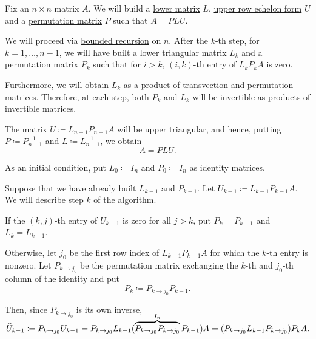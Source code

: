 \begin{algorithm}\label{alg:plu_decomposition}
  Fix an \( n \times n \) matrix \( A \). We will build a \hyperref[def:triangular_matrix]{lower  matrix} \( L \), \hyperref[def:upper_row_echelon_form]{upper row echelon form} \( U \) and a \hyperref[def:elementary_matrix/permutation]{permutation matrix} \( P \) such that \( A = PLU \).

  We will proceed via \hyperref[thm:bounded_transfinite_recursion]{bounded recursion} on \( n \). After the \( k \)-th step, for \( k = 1, \ldots, n - 1 \), we will have built a lower triangular matrix \( L_k \) and a permutation matrix \( P_k \) such that for \( i > k \), \( (i, k) \)-th entry of \( L_k P_k A \) is zero.

  Furthermore, we will obtain \( L_k \) as a product of \hyperref[def:elementary_matrix/transvection]{transvection} and permutation matrices. Therefore, at each step, both \( P_k \) and \( L_k \) will be \hyperref[def:inverse_matrix]{invertible} as products of invertible matrices.

  The matrix \( U \coloneqq L_{n-1} P_{n-1} A \) will be upper triangular, and hence, putting \( P \coloneqq P_{n-1}^{-1} \) and \( L \coloneqq L_{n-1}^{-1} \), we obtain
  \begin{equation*}
    A = PLU.
  \end{equation*}

  \begin{thmenum}
     As an initial condition, put \( L_0 \coloneqq I_n \) and \( P_0 \coloneqq I_n \) as identity matrices.

     Suppose that we have already built \( L_{k-1} \) and \( P_{k-1} \). Let \( U_{k-1} \coloneqq L_{k-1} P_{k-1} A \). We will describe step \( k \) of the algorithm.

    If the \( (k, j) \)-th entry of \( U_{k-1} \) is zero for all \( j > k \), put \( P_k = P_{k-1} \) and \( L_k = L_{k-1} \).

    Otherwise, let \( j_0 \) be the first row index of \( L_{k-1} P_{k-1} A \) for which the \( k \)-th entry is nonzero. Let \( P_{k \to j_0} \) be the permutation matrix exchanging the \( k \)-th and \( j_0 \)-th column of the identity and put
    \begin{equation*}
      P_k \coloneqq P_{k \to j_0} P_{k-1}.
    \end{equation*}

    Then, since \( P_{k \to j_0} \) is its own inverse,
    \begin{equation*}
      \widehat{U}_{k-1} \coloneqq P_{k \to j_0} U_{k-1} = P_{k \to j_0} L_{k-1} (\smash{ \overbrace{P_{k \to j_0} P_{k \to j_0}}^{I_n} P_{k-1}) A = (P_{k \to j_0} L_{k-1} P_{k \to j_0}) } P_k A.
    \end{equation*}


\end{thmenum}
\end{algorithm}
